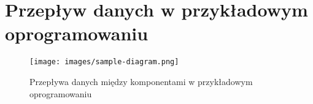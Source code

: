 \chapter{Przepływ danych w przykładowym oprogramowaniu}
\label{app:samplediagram}

\begin{figure}[h]
\centering
\texttt{[image: images/sample-diagram.png]}
\caption{Przepływa danych między komponentami w przykładowym oprogramowaniu}
\label{fig:samplediagram}
\end{figure}
